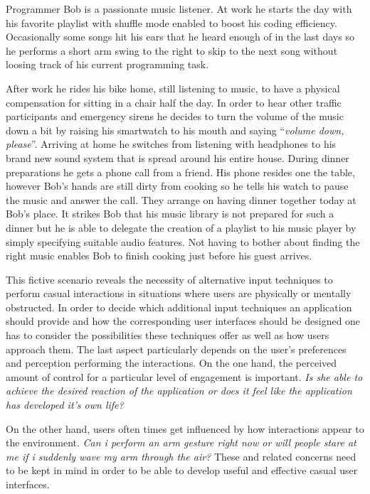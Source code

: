 \begin{addmargin}[1cm]{1cm}
Programmer Bob is a passionate music listener. At work he starts the day with his favorite playlist with shuffle mode enabled to boost his coding efficiency. Occasionally some songs hit his ears that he heard enough of in the last days so he performs a short arm swing to the right to skip to the next song without loosing track of his current programming task. 

After work he rides his bike home, still listening to music, to have a physical compensation for sitting in a chair half the day. In order to hear other traffic participants and emergency sirens he decides to turn the volume of the music down a bit by raising his smartwatch to his mouth and saying ``\textit{volume down, please}''. Arriving at home he switches from listening with headphones to his brand new sound system that is spread around his entire house. During dinner preparations he gets a phone call from a friend. His phone resides one the table, however Bob's hands are still dirty from cooking so he tells his watch to pause the music and answer the call. They arrange on having dinner together today at Bob's place. It strikes Bob that his music library is not prepared for such a dinner but he is able to delegate the creation of a playlist to his music player by simply specifying suitable audio features. Not having to bother about finding the right music enables Bob to finish cooking just before his guest arrives.\\
\end{addmargin}

This fictive scenario reveals the necessity of alternative input techniques to perform casual interactions in situations where users are physically or mentally obstructed. In order to decide which additional input techniques an application should provide and how the corresponding user interfaces should be designed one has to consider the possibilities these techniques offer as well as how users approach them. The last aspect particularly depends on the user's preferences and perception performing the interactions. On the one hand, the perceived amount of control for a particular level of engagement is important. \textit{Is she able to achieve the desired reaction of the application or does it feel like the application has developed it's own life?}

On the other hand, users often times get influenced by how interactions appear to the environment. \textit{Can i perform an arm gesture right now or will people stare at me if i suddenly wave my arm through the air?}
These and related concerns need to be kept in mind in order to be able to develop useful and effective casual user interfaces.

